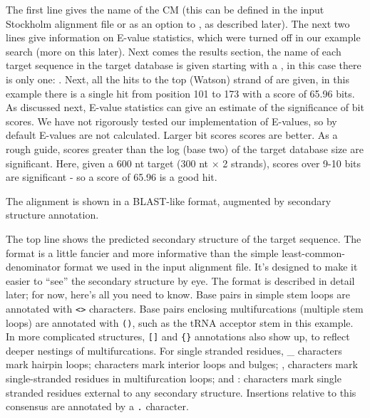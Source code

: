 The first line gives the name of the CM (this can be defined in the
input Stockholm alignment file or as an option to , as
described later).
The next two lines give information on E-value statistics, which were
turned off in our example search (more on this later).  Next comes
the results section, the name of each target sequence in the target
database is given starting with a \prog{$>$}, in this case there is
only one: . Next, all the hits to the top (Watson)
strand of  are given, in this example there is a single hit from
position 101 to 173 with a score of 65.96 bits. As discussed next,
E-value statistics can give an estimate of the significance of bit
scores. We have not rigorously tested our implementation of E-values,
so by default E-values are not calculated. Larger bit scores
scores are better. As a rough guide, scores greater than the log (base
two) of the target database size are significant.  Here, given a 600
nt target (300 nt $\times$ 2 strands), scores over 9-10 bits are
significant - so a score of 65.96 is a good hit.


The alignment is shown in a BLAST-like format, augmented by secondary
structure annotation. 

The top line shows the predicted secondary structure of the target
sequence. The format is a little fancier and more informative than the
simple least-common-denominator format we used in the input alignment
file. It's designed to make it easier to ``see'' the secondary
structure by eye. The format is described in detail later; for now,
here's all you need to know. Base pairs in simple stem loops are
annotated with \verb+<>+ characters. Base pairs enclosing
multifurcations (multiple stem loops) are annotated with \verb+()+,
such as the tRNA acceptor stem in this example. In more complicated
structures, \verb+[]+ and \verb+{}+ annotations also show up, to
reflect deeper nestings of multifurcations. For single stranded
residues, \_ characters mark hairpin loops; \- characters mark
interior loops and bulges; , characters mark single-stranded residues
in multifurcation loops; and : characters mark single stranded
residues external to any secondary structure. Insertions relative to
this consensus are annotated by a \verb+.+ character.

